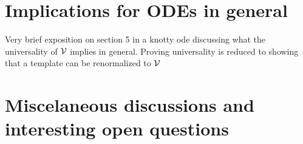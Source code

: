 \documentclass[paper.tex]{subfiles}
\begin{document}
\section{Implications for ODEs in general}

Very brief exposition on section 5 in a knotty ode discussing what the universality of $\mathcal{V}$ implies in general. Proving universality is reduced to showing that a template can be renormalized to $\mathcal{V}$


\section{Miscelaneous discussions and interesting open questions}
\end{document}
